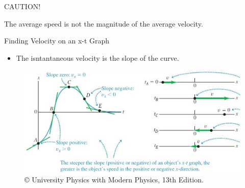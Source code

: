 \documentclass[]{beamer}
\begin{document}

\begin{frame}
CAUTION! 

\vspace{5mm}

The average  speed  is not the magnitude of the average  velocity.  
 \end{frame}




\begin{frame}
Finding Velocity on an x-t Graph
\vspace{3mm}

   
   \begin{itemize}
\item The isntantaneous velocity is the slope of the curve.

\end{itemize}
   
   \begin{figure}[h!]   
   \includegraphics[width=1.\textwidth]{images/9.jpg}
   \caption{ {\tiny © University Physics 
   with Modern Physics, 13th Edition.} }
\end{figure}

 \end{frame}




\end{document}
